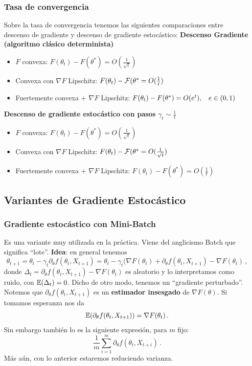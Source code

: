 \subsubsection{Tasa de convergencia}
Sobre la tasa de convergencia tenemos las siguientes comparaciones entre descenso de gradiente y descenso de gradiente estocástico:
\newp \textbf{Descenso Gradiente (algoritmo clásico determinista)}
\begin{itemize}
    \item $F$ convexa: $F(\theta_t)-F(\theta^*)=O(\frac{1}{\sqrt{t}})$
    \item Convexa con $\nabla F$ Lipschitz: $F(\theta_t)-\mathcal{F}(\theta^*=O(\frac{1}{t})$
    \item Fuertemente convexa + $\nabla F$ Lipschitz: $F(\theta_t)-F(\theta^*)=O(e^t),\hspace{.25cm}\, e\in(0,1)$
\end{itemize}
\newp \textbf{Descenso de gradiente estocástico con pasos $\gamma_t\sim \frac{1}{t}$}
\begin{itemize}
    \item $F$ convexa: $F(\theta_t)-F(\theta^*)=O(\frac{1}{\sqrt{t}})$
    \item Convexa con $\nabla F$ Lipschitz: $F(\theta_t)-\mathcal{F}(\theta^*=O(\frac{1}{\sqrt{t}})$
    \item Fuertemente convexa + $\nabla F$ Lipschitz: $F(\theta_t)-F(\theta^*)=O(\frac{1}{t})$
\end{itemize}
\subsection{Variantes de Gradiente Estocástico}
\subsubsection{Gradiente estocástico con Mini-Batch}  %
Es una variante muy utilizada en la práctica. Viene del anglicismo Batch que significa ``lote''.
\newp \textbf{Idea}: en general tenemos
$$ \theta_{t+1}=\theta_t - \gamma_t \partial_\theta f(\theta_t,X_{t+1})=
\theta_t - \gamma_t (\nabla F(\theta_t)+\partial_\theta f(\theta_t,X_{t+1})-\nabla F(\theta_t)\,,$$
donde $\Delta_t=\partial_\theta f(\theta_t,X_{t+1})-\nabla F(\theta_t)$ es aleatorio y lo interpretamos como ruido, con $\mathbb{E}(\Delta_t)=0$. Dicho de otro modo, tenemos un ``gradiente perturbado''.
\newline Notemos que $\partial_\theta f(\theta_t,X_{t+1})$ es un \textbf{estimador insesgado} de $\nabla F(\theta)$. Si tomamos esperanza nos da
$$ \mathbb{E}(\partial_\theta f(\theta_t,X_{t+1}))=\nabla F(\theta_t)\,.$$
Sin embargo también lo es la siguiente expresión, para $m$ fijo:
$$ \displaystyle\frac{1}{m}\sum^m_{i=1}\partial_\theta f(\theta_t,X_{t+i})\,.$$
Más aún, con lo anterior estaremos reduciendo varianza.

